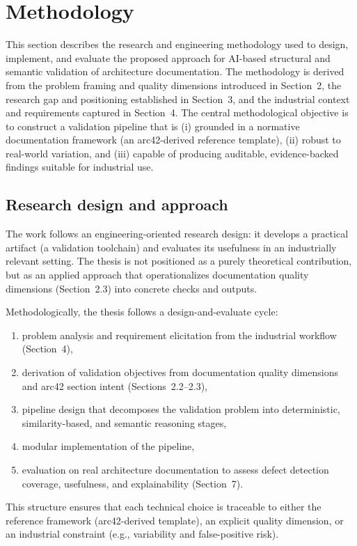 \section{Methodology}
This section describes the research and engineering methodology used to design, implement, and evaluate the proposed approach for AI-based structural and semantic validation of architecture documentation. The methodology is derived from the problem framing and quality dimensions introduced in Section~2, the research gap and positioning established in Section~3, and the industrial context and requirements captured in Section~4. The central methodological objective is to construct a validation pipeline that is (i) grounded in a normative documentation framework (an arc42-derived reference template), (ii) robust to real-world variation, and (iii) capable of producing auditable, evidence-backed findings suitable for industrial use.

\subsection{Research design and approach}
The work follows an engineering-oriented research design: it develops a practical artifact (a validation toolchain) and evaluates its usefulness in an industrially relevant setting. The thesis is not positioned as a purely theoretical contribution, but as an applied approach that operationalizes documentation quality dimensions (Section~2.3) into concrete checks and outputs.

Methodologically, the thesis follows a design-and-evaluate cycle:
\begin{enumerate}
    \item problem analysis and requirement elicitation from the industrial workflow (Section~4),
    \item derivation of validation objectives from documentation quality dimensions and arc42 section intent (Sections~2.2--2.3),
    \item pipeline design that decomposes the validation problem into deterministic, similarity-based, and semantic reasoning stages,
    \item modular implementation of the pipeline,
    \item evaluation on real architecture documentation to assess defect detection coverage, usefulness, and explainability (Section~7).
\end{enumerate}

This structure ensures that each technical choice is traceable to either the reference framework (arc42-derived template), an explicit quality dimension, or an industrial constraint (e.g., variability and false-positive risk).

